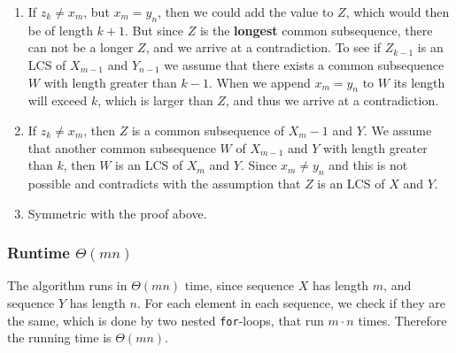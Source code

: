 \begin{enumerate}
  \item If $z_k\neq x_m$, but $x_m=y_n$, then we could add the value to $Z$,
  which would then be of length $k+1$. But since $Z$ is the \textbf{longest}
  common subsequence, there can not be a longer $Z$, and we arrive at a
  contradiction.\newline\newline
  To see if $Z_{k-1}$ is an LCS of $X_{m-1}$ and $Y_{n-1}$ we assume that there
  exists a common subsequence $W$ with length greater than $k-1$. When we append
  $x_m=y_n$ to $W$ its length will exceed $k$, which is larger than $Z$, and
  thus we arrive at a contradiction.
  \item If $z_k\neq x_m$, then $Z$ is a common subsequence of $X_m-1$ and $Y$.
  We assume that another common subsequence $W$ of $X_{m-1}$ and $Y$ with length
  greater than $k$, then $W$ is an LCS of $X_m$ and $Y$. Since $x_m\neq y_n$
  and this is not possible and contradicts with the assumption that $Z$ is an
  LCS of $X$ and $Y$.
  \item Symmetric with the proof above.
\end{enumerate}

\subsubsection*{Runtime $\Theta(mn)$}
The algorithm runs in $\Theta(mn)$ time, since sequence $X$ has length $m$, and
sequence $Y$ has length $n$. For each element in each sequence, we check if
they are the same, which is done by two nested \texttt{for}-loops, that run
$m\cdot n$ times. Therefore the running time is $\Theta(mn)$.
